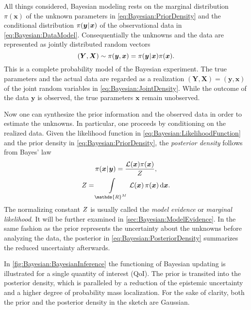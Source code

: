 All things considered, Bayesian modeling rests on the marginal distribution \(\pi(\bm{x})\) of the unknown parameters in \cref{eq:Bayesian:PriorDensity}
and the conditional distribution \(\pi(\bm{y} {\:\!}|{\:\!} \bm{x})\) of the observational data in \cref{eq:Bayesian:DataModel}.
Consequentially the unknowns and the data are represented as jointly distributed random vectors
\begin{equation} \label{eq:Bayesian:JointDensity}
  (\bm{Y},\bm{X}) \sim \pi(\bm{y},\bm{x}) = \pi(\bm{y} {\:\!}|{\:\!} \bm{x}) \pi(\bm{x}).
\end{equation}
This is a complete probability model of the Bayesian experiment.
The true parameters and the actual data are regarded as a realization \((\bm{Y},\bm{X}) = (\bm{y},\bm{x})\) of the joint random variables in \cref{eq:Bayesian:JointDensity}.
While the outcome of the data \(\bm{y}\) is observed, the true parameters \(\bm{x}\) remain unobserved.
\par %
Now one can synthesize the prior information and the observed data in order to estimate the unknowns.
In particular, one proceeds by conditioning on the realized data.
Given the likelihood function in \cref{eq:Bayesian:LikelihoodFunction} and the prior density in \cref{eq:Bayesian:PriorDensity},
the \emph{posterior density} follows from Bayes' law
\begin{gather}
  \pi(\bm{x} \cond \bm{y}) = \frac{\mathcal{L}(\bm{x}) \pi(\bm{x})}{\scale}, \label{eq:Bayesian:PosteriorDensity} \\
  \scale = \int\limits_{\mathds{R}^\dimParam} \mathcal{L}(\bm{x}) \, \pi(\bm{x}) \, \mathrm{d} \bm{x}. \label{eq:Bayesian:ModelEvidence}
\end{gather}
The normalizing constant \(Z\) is usually called the \emph{model evidence} or \emph{marginal likelihood}.
It will be further examined in \cref{sec:Bayesian:ModelEvidence}.
In the same fashion as the prior represents the uncertainty about the unknowns before analyzing the data,
the posterior in \cref{eq:Bayesian:PosteriorDensity} summarizes the reduced uncertainty afterwards.
\par %
In \cref{fig:Bayesian:BayesianInference} the functioning of Bayesian updating is illustrated for a single quantity of interest (QoI).
The prior is transited into the posterior density, which is paralleled by a reduction of the epistemic uncertainty and a higher degree of probability mass localization.
For the sake of clarity, both the prior and the posterior density in the sketch are Gaussian.

